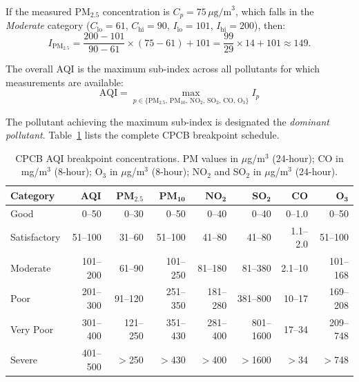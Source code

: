 \documentclass[12pt,a4paper]{article}
\newcommand{\aqi}{\mathrm{AQI}}
\begin{document}
\begin{example}
If the measured $\text{PM}_{2.5}$ concentration is $C_p = 75\,\mu\text{g/m}^3$,
which falls in the \emph{Moderate} category
($C_{\text{lo}} = 61$, $C_{\text{hi}} = 90$, $I_{\text{lo}} = 101$,
$I_{\text{hi}} = 200$), then:
\[
I_{\text{PM}_{2.5}} = \frac{200 - 101}{90 - 61} \times (75 - 61) + 101
                    = \frac{99}{29} \times 14 + 101
                    \approx 149.
\]
\end{example}

The overall AQI is the maximum sub-index across all pollutants for which
measurements are available:
\begin{equation}
\aqi = \max_{p \in \{\text{PM}_{2.5},\,\text{PM}_{10},\,\text{NO}_2,\,
                     \text{SO}_2,\,\text{CO},\,\text{O}_3\}} I_p
\label{eq:aqimax}
\end{equation}

The pollutant achieving the maximum sub-index is designated the
\emph{dominant pollutant}. Table~\ref{tab:cpcbbreaks} lists the complete
CPCB breakpoint schedule.

\begin{table}[H]
\centering
\caption[CPCB AQI breakpoint concentrations]{%
CPCB AQI breakpoint concentrations. PM values in $\mu$g/m$^3$ (24-hour);
CO in mg/m$^3$ (8-hour); O$_3$ in $\mu$g/m$^3$ (8-hour);
NO$_2$ and SO$_2$ in $\mu$g/m$^3$ (24-hour).}
\label{tab:cpcbbreaks}
\begin{tabular}{@{}lrrrrrrr@{}}
\toprule
\textbf{Category} & \textbf{AQI} &
$\mathbf{PM_{2.5}}$ & $\mathbf{PM_{10}}$ &
$\mathbf{NO_2}$ & $\mathbf{SO_2}$ & \textbf{CO} & $\mathbf{O_3}$ \\
\midrule
Good          & 0--50   & 0--30   & 0--50   & 0--40   & 0--40   & 0--1.0  & 0--50   \\
Satisfactory  & 51--100 & 31--60  & 51--100 & 41--80  & 41--80  & 1.1--2.0 & 51--100 \\
Moderate      & 101--200 & 61--90 & 101--250 & 81--180 & 81--380 & 2.1--10  & 101--168 \\
Poor          & 201--300 & 91--120 & 251--350 & 181--280 & 381--800 & 10--17  & 169--208 \\
Very Poor     & 301--400 & 121--250 & 351--430 & 281--400 & 801--1600 & 17--34 & 209--748 \\
Severe        & 401--500 & $>$250 & $>$430 & $>$400  & $>$1600 & $>$34   & $>$748  \\
\bottomrule
\end{tabular}
\end{table}
\end{document}
